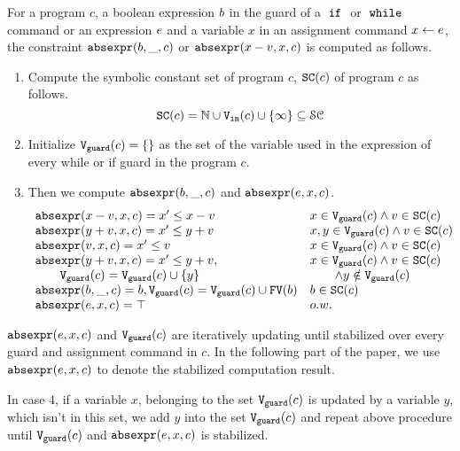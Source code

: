 

\begin{defn}
 \label{def:constraint_compute}
 For a program $c$, a boolean expression $b$ in the guard of a $\;\mathtt{if}\;$ or $\;\mathtt{while}\;$ command
 or an expression $e$ and a variable $x$
 in an assignment command $\mathrel{ x \leftarrow e }$,
 the constraint $\mathtt{abs}{\mathtt{expr}}(b, \_, c )$ or $\mathtt{abs}{\mathtt{expr}}(x - v, x, c)$ is computed as follows.
 \begin{enumerate}
 \item Compute the symbolic constant set of program $c$, $\mathtt{SC}(c)$ of program $c$ as follows.
 \[
 \mathtt{SC}(c) = \mathbb{N} \cup {\ensuremath{\mathtt{V_{\mathtt{in}}}}}(c) \cup \{\infty \} \subseteq \mathcal{SC}
 \]
 \item Initialize 
 $\mathtt{V}_{\mathtt{guard}}(c) = \{\}$ as the set of the variable used in the expression of every while or if guard in the program $c$.
 \item Then we compute $\mathtt{abs}{\mathtt{expr}}(b, \_, c )$ and $\mathtt{abs}{\mathtt{expr}}(e, x, c)$.
 \[
 \begin{array}{ll} 
 \mathtt{abs}{\mathtt{expr}}(x - v, x, c) = x' \leq x - v & x \in \mathtt{V}_{\mathtt{guard}}(c)\land v \in \mathtt{SC}(c) \\
 \mathtt{abs}{\mathtt{expr}}(y + v, x, c) = x' \leq y + v & x, y \in \mathtt{V}_{\mathtt{guard}}(c)\land v \in \mathtt{SC}(c)\\
 \mathtt{abs}{\mathtt{expr}}(v, x, c) = x' \leq v & x \in \mathtt{V}_{\mathtt{guard}}(c)\land v \in \mathtt{SC}(c) \\
 \mathtt{abs}{\mathtt{expr}}(y + v, x, c) = x' \leq y + v, & x \in \mathtt{V}_{\mathtt{guard}}(c)\land v \in \mathtt{SC}(c)\\
 \qquad \mathtt{V}_{\mathtt{guard}}(c) = \mathtt{V}_{\mathtt{guard}}(c) \cup \{y\} & \qquad \land y \notin \mathtt{V}_{\mathtt{guard}}(c) \\
 \mathtt{abs}{\mathtt{expr}}(b, \_, c) = b, \mathtt{V}_{\mathtt{guard}}(c) = \mathtt{V}_{\mathtt{guard}}(c) \cup \mathtt{FV}(b) & b \in \mathtt{SC}(c) \\
 \mathtt{abs}{\mathtt{expr}}(e, x, c) = \top & {o.w.} \\
 \end{array}
 \]
 \end{enumerate}
 $\mathtt{abs}{\mathtt{expr}}(e, x, c)$ and $\mathtt{V}_{\mathtt{guard}}(c)$ are iteratively updating until stabilized over every guard and assignment command in $c$. In the following part of the paper, we use $\mathtt{abs}{\mathtt{expr}}(e, x, c)$
 to denote the stabilized computation result.
 \end{defn}
%
In case 4, if a variable $x$, belonging to the set 
 $\mathtt{V}_{\mathtt{guard}}(c)$ is updated by a variable $y$, which isn't in this set, 
 we add $y$ into the set $\mathtt{V}_{\mathtt{guard}}(c)$ and repeat 
 above procedure until $\mathtt{V}_{\mathtt{guard}}(c)$ and $\mathtt{abs}{\mathtt{expr}}(e, x, c)$ is stabilized. 
